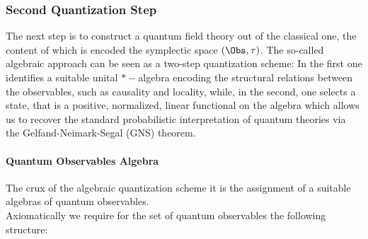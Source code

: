 \documentclass[Main]{subfiles}
\begin{document}
							
	\subsubsection{Second Quantization Step}%
		The next step is to construct a quantum field theory out of the classical one, the content of which is encoded the symplectic space $(\Obs, \tau)$. 
		The so-called algebraic approach can be seen as a two-step quantization scheme: In the first one identifies a suitable unital  $\ast-$algebra encoding the structural relations between the observables, such as causality and locality, while, in the second, one selects a state, that is a positive, normalized, linear functional on the algebra which allows us to recover the standard probabilistic interpretation of quantum theories via the Gelfand-Neimark-Segal (GNS) theorem.

		\paragraph{Quantum Observables Algebra}   		
		The crux of the algebraic quantization scheme it is the assignment of a suitable algebras of quantum observables.\\
		Axiomatically we require for the set of quantum observables the following structure:
		
\end{document}
